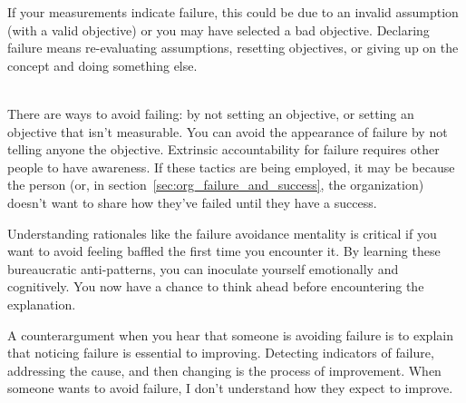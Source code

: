 If your measurements indicate failure, this could be due to an invalid assumption (with a valid objective) or you may have selected a bad objective. Declaring failure means re-evaluating assumptions, resetting objectives, or giving up on the concept and doing something else.

\ \\

There are ways to avoid failing: by not setting an objective, or setting an objective that isn't measurable. You can avoid the appearance of failure by not telling anyone the objective. Extrinsic accountability for failure requires other people to have awareness. If these tactics are being employed, it may be because the person (or, in section~\ref{sec:org_failure_and_success}, the organization) doesn't want to share how they've failed until they have a success. 

Understanding rationales like the failure avoidance mentality is critical if you want to avoid feeling baffled the first time you encounter it. By learning these bureaucratic anti-patterns, you can inoculate yourself emotionally and cognitively. You now have a chance to think ahead before encountering the explanation.

A counterargument when you hear that someone is avoiding failure is to explain that noticing failure is essential to improving. Detecting indicators of failure, addressing the cause, and then changing is the process of improvement. When someone wants to avoid failure, I don't understand how they expect to improve. 


